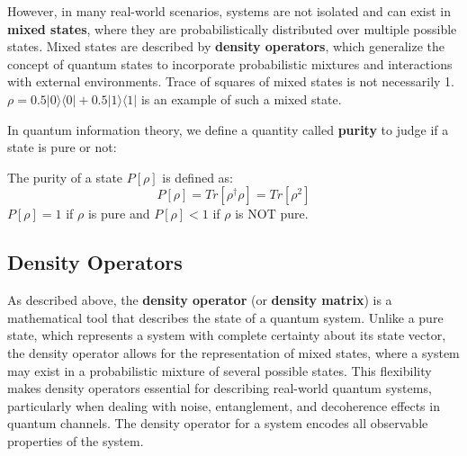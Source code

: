 However, in many real-world scenarios, systems are not isolated and can exist in \textbf{mixed states},
where they are probabilistically distributed over multiple possible states. Mixed states are described
by \textbf{density operators}, which generalize the concept of quantum states to incorporate
probabilistic mixtures and interactions with external environments. Trace of squares of mixed states is
not necessarily 1. $\rho = 0.5 |0 \rangle \langle 0| + 0.5 |1 \rangle \langle 1|$ is an example of such
a mixed state.

In quantum information theory, we define a quantity called \textbf{purity} to judge if a state is pure
or not:

\begin{definition}[Purity]
    The purity of a state $P[\rho]$ is defined as:
    \begin{equation*}
        P[\rho] = Tr[\rho^\dagger\rho] = Tr[\rho^2]
    \end{equation*}
    $P[\rho] = 1$ if $\rho$ is pure and $P[\rho] < 1$ if $\rho$ is NOT pure.
\end{definition}

\subsection{Density Operators}

As described above, the \textbf{density operator} (or \textbf{density matrix})
is a mathematical tool that describes the state of a quantum system. Unlike a pure state, which
represents a system with complete certainty about its state vector, the density operator allows
for the representation of mixed states, where a system may exist in a probabilistic mixture of
several possible states. This flexibility makes density operators essential for describing
real-world quantum systems, particularly when dealing with noise, entanglement, and decoherence
effects in quantum channels. The density operator for a system encodes all observable properties
of the system.

